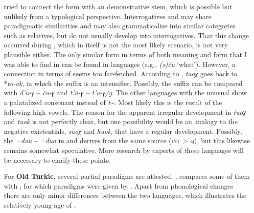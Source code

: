 \largerpage
\citet{Stachowski2015} tried to connect the  form with an  demonstrative stem, which is possible but unlikely from a typological perspective. Interrogatives and  may share paradigmatic similarities and may also grammaticalize into similar categories such as relatives, but  do not usually develop into interrogatives. That this change occurred during , which in itself is not the most likely scenario, is not very plausible either. The only similar form in terms of both meaning and form that I was able to find in  can be found in  languages (e.g.,  \textit{(ə)ču} ‘what’). However, a connection in terms of  seems too far-fetched. According to \citet[85]{Stachowski2015}, \textit{tuoχ} goes back to *\textit{to-ok}, in which the suffix is an intensifier. Possibly, the suffix can be compared with  \textit{d’u-γ} {\textasciitilde} \textit{ču-γ} and  \textit{t’ü-γ {\textasciitilde} t’u-γ/g}. The other  languages with the unusual  show a palatalized consonant instead of \textit{t{\textasciitilde}}. Most likely this is the result of the following high vowels. The reason for the apparent irregular development in  \textit{tuoχ} and  \textit{tuok} is not perfectly clear, but one possibility would be an analogy to the negative existentials,  \textit{suoχ} and  \textit{huok}, that have a regular development. Possibly, the  \textit{=duu} {\textasciitilde} \textit{=duo} in  and  derives from the same source (\textsc{int} > \textsc{q}), but this likewise remains somewhat speculative. More research by experts of these languages will be necessary to clarify these points.
 
 \largerpage
For \textbf{Old Turkic}, several partial  paradigms are attested. . compares some of them with , for which paradigms were given by \citet{Roos2000}. Apart from phonological changes there are only minor differences between the two languages, which illustrates the relatively young age of .




